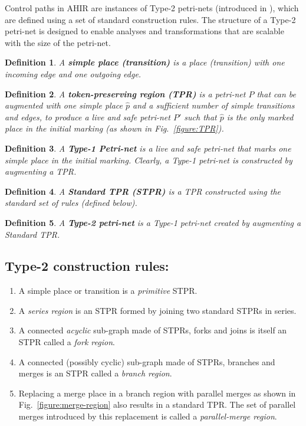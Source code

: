 \documentclass[conference]{IEEEtran}
\newtheorem{definition}{Definition}[section]
\begin{document}
Control paths in AHIR are instances of Type-2 petri-nets (introduced
in \cite{ahir_thesis}), which
are defined using a set of standard construction rules. 
The structure of a Type-2 petri-net is
designed to enable analyses and transformations that are scalable with
the size of the petri-net.

\begin{definition} A {\bf simple place (transition)} is a place
(transition) with one incoming edge and one outgoing edge.
\end{definition}

\begin{definition} A {\bf token-preserving region (TPR)} is a
petri-net $P$ that can be augmented with one simple place $\hat{p}$
and a sufficient number of simple transitions and edges, to produce a
live and safe petri-net $P'$ such that $\hat{p}$ is the only marked
place in the initial marking (as shown in Fig.~\ref{figure:TPR}).
\label{definition:TPR}
\end{definition}

\begin{definition} A {\bf Type-1 Petri-net} is a live and safe
petri-net that marks one simple place in the initial marking. Clearly,
a Type-1 petri-net is constructed by augmenting a TPR.
\end{definition}

\begin{definition}
A {\bf Standard TPR (STPR)} is a TPR constructed using the standard
set of rules (defined below).
\end{definition}

\begin{definition} A {\bf Type-2 petri-net} is a Type-1 petri-net
created by augmenting a Standard TPR.
\end{definition}

\subsection*{Type-2 construction rules:}

\begin{enumerate}
  \item A simple place or transition is a {\em primitive} STPR.

  \item A {\em series region} is an STPR formed by joining two
        standard STPRs in series.

  \item A connected {\it acyclic} sub-graph made of STPRs, forks and
        joins is itself an STPR called a {\em fork region}.

  \item A connected (possibly cyclic) sub-graph made of STPRs, branches
        and merges is an STPR called a {\em branch region}.

  \item Replacing a merge place in a branch region with parallel
        merges as shown in Fig.~\ref{figure:merge-region} also
        results in a standard TPR. The set of parallel merges
        introduced by this replacement is called a {\em parallel-merge
        region}.
\end{enumerate}
\end{document}
